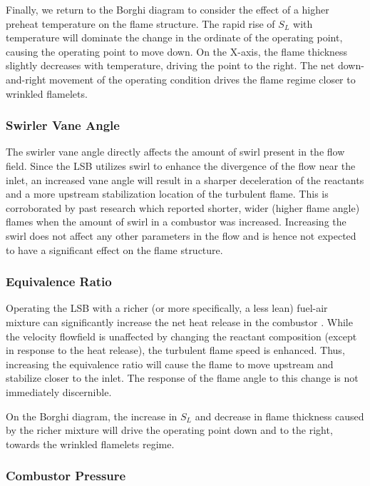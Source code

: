Finally, we return to the Borghi diagram to consider the effect of a higher preheat temperature on the flame structure.
The rapid rise of \(S_L\) with temperature will dominate the change in the ordinate of the operating point, causing the operating point to move down.
On the X-axis, the flame thickness slightly decreases with temperature, driving the point to the right.
The net down-and-right movement of the operating condition drives the flame regime closer to wrinkled flamelets.

\subsubsection{Swirler Vane Angle}

The swirler vane angle directly affects the amount of swirl present in the flow field.
Since the LSB utilizes swirl to enhance the divergence of the flow near the inlet, an increased vane angle will result in a sharper deceleration of the reactants and a more upstream stabilization location of the turbulent flame.
This is corroborated by past research\cite{1986-starner} which reported shorter, wider (higher flame angle) flames when the amount of swirl in a combustor was increased.
Increasing the swirl does not affect any other parameters in the flow and is hence not expected to have a significant effect on the flame structure.

\subsubsection{Equivalence Ratio}

Operating the LSB with a richer (or more specifically, a less lean) fuel-air mixture can significantly increase the net heat release in the combustor .
While the velocity flowfield is unaffected by changing the reactant composition (except in response to the heat release), the turbulent flame speed is enhanced.
Thus, increasing the equivalence ratio will cause the flame to move upstream and stabilize closer to the inlet.
The response of the flame angle to this change is not immediately discernible.

On the Borghi diagram, the increase in \(S_L\) and decrease in flame thickness caused by the richer mixture will drive the operating point down and to the right, towards the wrinkled flamelets regime.

\subsubsection{Combustor Pressure}

